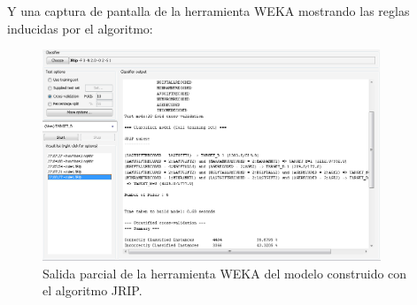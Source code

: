 Y una captura de pantalla de la herramienta WEKA mostrando las reglas inducidas por el algoritmo:

\begin{figure}[H]
\begin{center}
\includegraphics[width=0.9\textwidth]{img/jrip-1}
\caption{Salida parcial de la herramienta WEKA del modelo construido con el algoritmo JRIP.}
\end{center}
\end{figure}